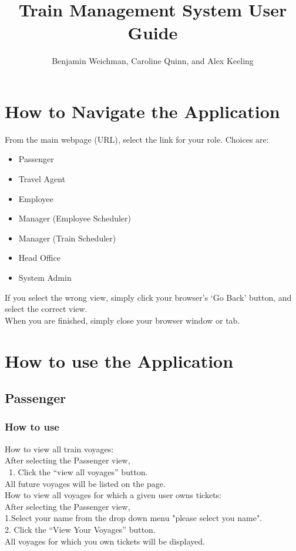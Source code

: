 \documentclass[letter]{article}
\title{Train Management System User Guide}
\author{Benjamin Weichman, Caroline Quinn, and Alex Keeling}
\date{}
\begin{document}
\maketitle

\section{How to Navigate the Application}
From the main webpage (URL), select the link for your role. Choices are: 
\begin{itemize}
\item Passenger
\item Travel Agent
\item Employee
\item Manager (Employee Scheduler)
\item Manager (Train Scheduler)
\item Head Office
\item System Admin
\end{itemize}

If you select the wrong view, simply click your browser's `Go Back' button, and select the correct view. \\

When you are finished, simply close your browser window or tab.


\section{How to use the Application}

\subsection{Passenger}
\subsubsection{How to use}

How to view all train voyages:\\ 
After selecting the Passenger view,\\\
1. Click the “view all voyages” button.\\
All future voyages will be listed on the page.\\ 

How to view all voyages for which a given user owns tickets:\\
After selecting the Passenger view, \\
1.Select your name from the drop down menu "please select you name".\\
2. Click the “View Your Voyages” button.\\
All voyages for which you own tickets will be displayed. 
\end{document}
